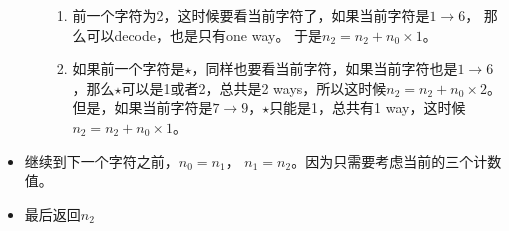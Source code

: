 \documentclass[a4paper,12pt]{article}
\begin{document}
\begin{CJK*}{UTF8}{gbsn}
\begin{itemize}
\begin{enumerate}
\begin{enumerate}
					\item 前一个字符为2，这时候要看当前字符了，如果当前字符是$1 \rightarrow 6$， 那么可以decode，也是只有one way。 于是$n_2 = n_2 + n_0 \times 1$。
					\item 如果前一个字符是$\star$，同样也要看当前字符，如果当前字符也是$1 \rightarrow 6$，那么$\star$可以是1或者2，总共是2 ways，所以这时候$n_2=n_2 + n_0\times 2$。但是，如果当前字符是$ 7 \rightarrow 9$，$\star$只能是1，总共有1 way，这时候$n_2 = n_2 + n_0\times 1$。
				\end{enumerate}
		\end{enumerate}
	\item 继续到下一个字符之前，$n_0=n_1$， $n_1 = n_2$。因为只需要考虑当前的三个计数值。
	\item 最后返回$n_2$
	\end{itemize}
	\clearpage
	\end{CJK*}
\end{document}
